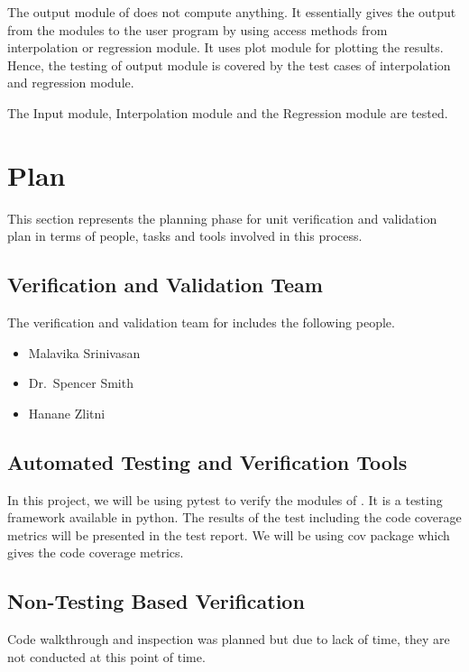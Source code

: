 \documentclass[12pt, titlepage]{article}
\begin{document}
The output module of \famname{} does not compute anything. It essentially gives 
the output from the modules to the user program by using access methods from 
interpolation or regression module. It uses plot module for plotting the 
results. Hence, the testing of output module is covered by the test cases of 
interpolation and regression module.

The Input module, Interpolation module and the Regression module are tested.


\section{Plan}

This section represents the planning phase for unit verification and validation 
plan in terms of people, tasks and tools involved in this process.
	
\subsection{Verification and Validation Team}

The verification and validation team for \famname{} includes the following 
people.
\begin{itemize}
	\item Malavika Srinivasan 
	\item Dr.\ Spencer Smith 
	\item Hanane Zlitni
\end{itemize}

\subsection{Automated Testing and Verification Tools}

In this project, we will be using pytest to verify the modules of \famname{}. 
It is a testing framework available in python. The results of the test 
including the code coverage metrics will be presented in the test report. We 
will be using cov package which gives the code coverage metrics.

\subsection{Non-Testing Based Verification}

Code walkthrough and inspection was planned but due to lack of time, they are 
not conducted at this point of time.
\end{document}
